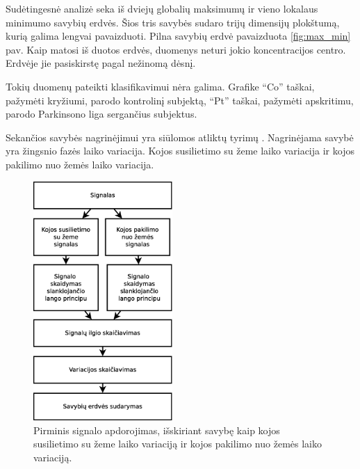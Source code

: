 \documentclass[]{vgtuef}
\begin{document}
Sudėtingesnė analizė seka iš dviejų globalių maksimumų ir vieno lokalaus minimumo savybių erdvės. Šios tris savybės sudaro trijų dimensijų plokštumą, kurią galima lengvai pavaizduoti. Pilna savybių erdvė pavaizduota \ref{fig:max_min} pav. Kaip matosi iš duotos erdvės, duomenys neturi jokio koncentracijos centro. Erdvėje jie pasiskirstę pagal nežinomą dėsnį.

Tokių duomenų pateikti klasifikavimui nėra galima. Grafike ``Co'' taškai, pažymėti kryžiumi, parodo kontrolinį subjektą, ``Pt'' taškai, pažymėti apskritimu, parodo Parkinsono liga sergančius subjektus.

Sekančios savybės nagrinėjimui yra siūlomos atliktų tyrimų \cite{16053531,KNUTSSON01011972,Delval_Salleron_Bourriez_Bleuse_Moreau_Krystkowiak_Defebvre_Devos_Duhamel_2008}. Nagrinėjama savybė yra žingsnio fazės laiko variacija. Kojos susilietimo su žeme laiko variacija ir kojos pakilimo nuo žemės laiko variacija.

\begin{figure}[!t]
  \centering
  \includegraphics[width=200px]{figures/pirminis_signalo_apdorojimas_skaiciuojant_variacija.eps}
  \caption{Pirminis signalo apdorojimas, išskiriant savybę kaip kojos
    susilietimo su žeme laiko variaciją ir kojos pakilimo nuo žemės
    laiko variaciją.}
  \label{fig:stance_swing_extract}
\end{figure}
\end{document}

